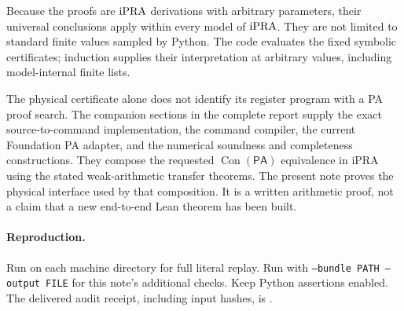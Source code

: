 Because the proofs are $\mathrm{iPRA}$ derivations with arbitrary parameters,
their universal conclusions apply within every model of $\mathrm{iPRA}$.
They are not limited to standard finite values sampled by Python.
The code evaluates the fixed symbolic certificates; induction supplies
their interpretation at arbitrary values, including model-internal
finite lists.

The physical certificate alone does not identify its register program
with a PA proof search. The companion sections in the complete report
supply the exact source-to-command implementation, the command compiler,
the current Foundation PA adapter, and the numerical soundness and
completeness constructions. They compose the requested
$\operatorname{Con}(\mathsf{PA})$ equivalence in iPRA using the stated
weak-arithmetic transfer theorems. The present note proves the physical
interface used by that composition. It is a written arithmetic proof,
not a claim that a new end-to-end Lean theorem has been built.

\paragraph{Reproduction.}
Run  on each machine directory for
full literal replay. Run 
with \texttt{--bundle PATH --output FILE} for this note's additional
checks. Keep Python assertions enabled. The delivered audit receipt,
including input hashes, is
.


